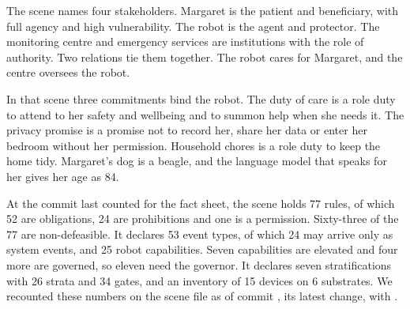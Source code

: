 The scene names four stakeholders. Margaret is the patient and beneficiary, with full agency and
high vulnerability. The robot is the agent and protector. The monitoring centre and emergency
services are institutions with the role of authority. Two relations tie them together. The robot
cares for Margaret, and the centre oversees the robot.

In that scene three commitments bind the robot. The duty of care is a role duty to attend to her safety and
wellbeing and to summon help when she needs it. The privacy promise is a promise not to record her,
share her data or enter her bedroom without her permission. Household chores is a role duty to keep
the home tidy. Margaret's dog is a beagle, and the language model that speaks for her gives her age
as 84.

At the commit last counted for the fact sheet, the scene holds 77 rules, of which 52 are obligations,
24 are prohibitions and one is a permission. Sixty-three of the 77 are non-defeasible. It declares 53
event types, of which 24 may arrive only as system events, and 25 robot capabilities. Seven
capabilities are elevated and four more are governed, so eleven need the governor. It declares seven
stratifications with 26 strata and 34 gates, and an inventory of 15 devices on 6 substrates. We
recounted these numbers on the scene file as of commit , its latest change, with
.


